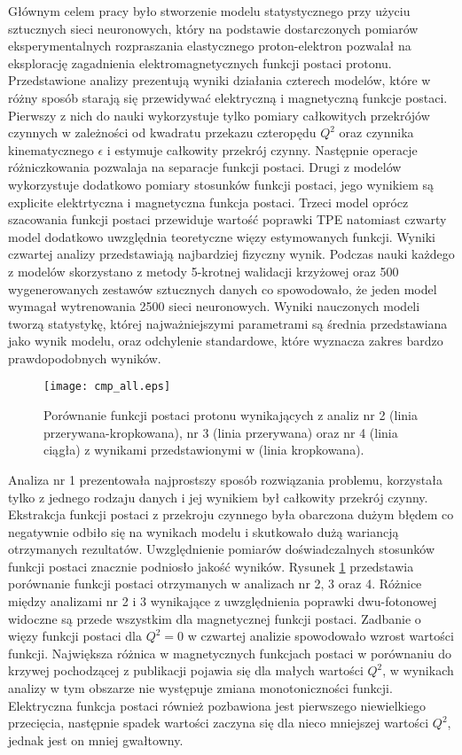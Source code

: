 \documentclass[11pt]{book}
\theoremstyle{definition}
\begin{document}
Głównym celem pracy było stworzenie modelu statystycznego przy użyciu sztucznych sieci neuronowych, który na podstawie dostarczonych pomiarów eksperymentalnych rozpraszania elastycznego proton-elektron pozwalał na eksplorację zagadnienia elektromagnetycznych funkcji postaci protonu. Przedstawione analizy prezentują wyniki działania czterech modelów, które w różny sposób starają się przewidywać elektryczną i magnetyczną funkcje postaci. Pierwszy z nich do nauki wykorzystuje tylko pomiary całkowitych przekrójów czynnych w zależności od kwadratu przekazu czteropędu $Q^2$ oraz czynnika kinematycznego $\epsilon$ i estymuje całkowity przekrój czynny. Następnie operacje różniczkowania pozwalaja na separacje funkcji postaci. Drugi z modelów wykorzystuje dodatkowo pomiary stosunków funkcji postaci, jego wynikiem są explicite elektrtyczna i magnetyczna funkcja postaci. Trzeci model oprócz szacowania funkcji postaci przewiduje wartość poprawki TPE natomiast czwarty model dodatkowo uwzględnia teoretyczne więzy estymowanych funkcji. Wyniki czwartej analizy przedstawiają najbardziej fizyczny wynik. Podczas nauki każdego z modelów skorzystano z metody 5-krotnej walidacji krzyżowej oraz 500 wygenerowanych zestawów sztucznych danych co spowodowało, że jeden model wymagał wytrenowania 2500 sieci neuronowych. Wyniki nauczonych modeli tworzą statystykę, której najważniejszymi parametrami są średnia przedstawiana jako wynik modelu, oraz odchylenie standardowe, które wyznacza zakres bardzo prawdopodobnych wyników.

\begin{figure}[hp!]
	\centering
	\texttt{[image: cmp\_all.eps]}
	\caption{Porównanie funkcji postaci protonu wynikających z analiz nr 2 (linia przerywana-kropkowana), nr 3 (linia przerywana) oraz nr 4 (linia ciągła) z wynikami przedstawionymi w \cite{2009PhRvC..79f5204A} (linia kropkowana).} 
	\label{fig:cmp_all}
\end{figure}

Analiza nr 1 prezentowała najprostszy sposób rozwiązania problemu, korzystała tylko z jednego rodzaju danych i jej wynikiem był całkowity przekrój czynny. Ekstrakcja funkcji postaci z przekroju czynnego była obarczona dużym błędem co negatywnie odbiło się na wynikach modelu i skutkowało dużą wariancją otrzymanych rezultatów. Uwzględnienie pomiarów doświadczalnych stosunków funkcji postaci znacznie podniosło jakość wyników. Rysunek \ref{fig:cmp_all} przedstawia porównanie funkcji postaci otrzymanych w analizach nr 2, 3 oraz 4. Różnice między analizami nr 2 i 3 wynikające z uwzględnienia poprawki dwu-fotonowej widoczne są przede wszystkim dla magnetycznej funkcji postaci. Zadbanie o więzy funkcji postaci dla $Q^2=0$ w czwartej analizie spowodowało wzrost wartości funkcji. Największa różnica w magnetycznych funkcjach postaci w porównaniu do krzywej pochodzącej z publikacji \cite{2009PhRvC..79f5204A} pojawia się dla małych wartości $Q^2$, w wynikach analizy w tym obszarze nie występuje zmiana monotoniczności funkcji. Elektryczna funkcja postaci również pozbawiona jest pierwszego niewielkiego przecięcia, następnie spadek wartości zaczyna się dla nieco mniejszej wartości $Q^2$, jednak jest on mniej gwałtowny. 
\end{document}
